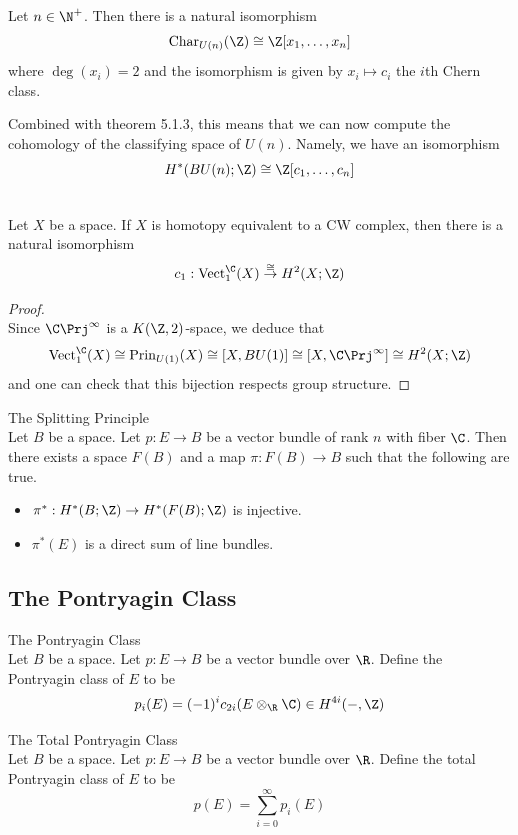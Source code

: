 \documentclass[a4paper]{article}
\begin{document}
\begin{prp}{}{}
Let $n\in\N^+$. Then there is a natural isomorphism $$\text{Char}_{U(n)}(\Z)\cong\Z[x_1,\dots,x_n]$$ where $\deg(x_i)=2$ and the isomorphism is given by $x_i\mapsto c_i$ the $i$th Chern class. 
\end{prp}

Combined with theorem 5.1.3, this means that we can now compute the cohomology of the  classifying space of $U(n)$. Namely, we have an isomorphism $$H^\ast(BU(n);\Z)\cong\Z[c_1,\dots,c_n]$$

\begin{prp}{}{}\\
Let $X$ be a space. If $X$ is homotopy equivalent to a CW complex, then there is a natural isomorphism $$c_1:\text{Vect}_1^\C(X)\overset{\cong}{\to}H^2(X;\Z)$$
\begin{proof}\\
Since $\C\Prj^\infty$ is a $K(\Z,2)$-space, we deduce that $$\text{Vect}_1^\C(X)\cong\text{Prin}_{U(1)}(X)\cong[X,BU(1)]\cong[X,\C\Prj^\infty]\cong H^2(X;\Z)$$ and one can check that this bijection respects group structure. 
\end{proof}
\end{prp}

\begin{thm}{The Splitting Principle}{}\\
Let $B$ be a space. Let $p:E\to B$ be a vector bundle of rank $n$ with fiber $\C$. Then there exists a space $F(B)$ and a map $\pi:F(B)\to B$ such that the following are true. 
\begin{itemize}
\item $\pi^\ast:H^\ast(B;\Z)\to H^\ast(F(B);\Z)$ is injective. 
\item $\pi^\ast(E)$ is a direct sum of line bundles. 
\end{itemize}
\end{thm}

\subsection{The Pontryagin Class}
\begin{defn}{The Pontryagin Class}{}\\
Let $B$ be a space. Let $p:E\to B$ be a vector bundle over $\R$. Define the Pontryagin class of $E$ to be $$p_i(E)=(-1)^ic_{2i}(E\otimes_\R\C)\in H^{4i}(-,\Z)$$
\end{defn}

\begin{defn}{The Total Pontryagin Class}{}\\
Let $B$ be a space. Let $p:E\to B$ be a vector bundle over $\R$. Define the total Pontryagin class of $E$ to be $$p(E)=\sum_{i=0}^\infty p_i(E)$$
\end{defn}
\end{document}
